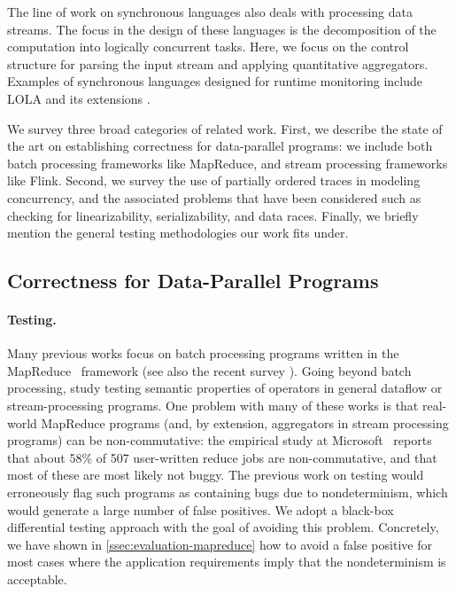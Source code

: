 The line of work on synchronous languages \cite{BCEHlGdS2003SL} also deals with processing data streams. The focus in the design of these languages is the decomposition of the computation into logically concurrent tasks. Here, we focus on the control structure for parsing the input stream and applying quantitative aggregators.
Examples of synchronous languages designed for runtime monitoring include LOLA \cite{d2005lola} and its
extensions \cite{bozzelli2016foundations}.


We survey three broad categories of related work. First, we describe the state of the art on establishing correctness for data-parallel programs: we include both batch processing frameworks like MapReduce, and stream processing frameworks like Flink.
Second, we survey the use of partially ordered traces in modeling concurrency, and the associated problems that have been considered such as checking for linearizability, serializability, and data races.
Finally, we briefly mention the general testing methodologies our work fits under.

\subsection{Correctness for Data-Parallel Programs}

\paragraph{Testing.}
Many previous works focus on batch processing programs written in the MapReduce~\cite{MapReduce2008} framework \cite{csallner2011new,xu2013semantic,marynowski2012testing,chen2016commutativity} (see also the recent survey \cite{moran2019testing}). Going beyond batch processing, \cite{xu2013testing} study testing semantic properties of operators in general dataflow or stream-processing programs.
One problem with many of these works \cite{csallner2011new,xu2013semantic,xu2013testing,chen2016commutativity} is that real-world MapReduce programs (and, by extension, aggregators in stream processing programs) can be non-commutative: the empirical study at Microsoft~\cite{xiao2014nondeterminism} reports that about 58\% of 507 user-written reduce jobs are non-commutative, and that most of these are most likely not buggy. The previous work on testing would erroneously flag such programs as containing bugs due to nondeterminism, which would generate a large number of false positives. We adopt a black-box differential testing approach with the goal of avoiding this problem. Concretely, we have shown in \cref{ssec:evaluation-mapreduce} how to avoid a false positive for most cases where the application requirements imply that the nondeterminism is acceptable.

